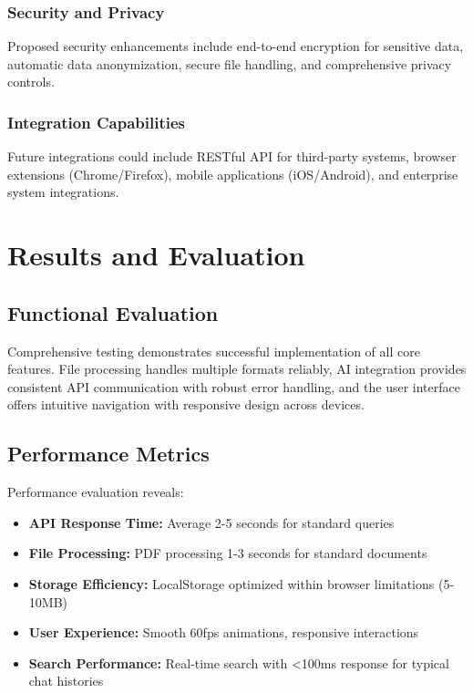 \documentclass[conference]{IEEEtran}
\begin{document}
\subsubsection{Security and Privacy}
Proposed security enhancements include end-to-end encryption for sensitive data, automatic data anonymization, secure file handling, and comprehensive privacy controls.

\subsubsection{Integration Capabilities}
Future integrations could include RESTful API for third-party systems, browser extensions (Chrome/Firefox), mobile applications (iOS/Android), and enterprise system integrations.

\section{Results and Evaluation}

\subsection{Functional Evaluation}
Comprehensive testing demonstrates successful implementation of all core features. File processing handles multiple formats reliably, AI integration provides consistent API communication with robust error handling, and the user interface offers intuitive navigation with responsive design across devices.

\subsection{Performance Metrics}
Performance evaluation reveals:
\begin{itemize}[itemsep=0pt, parsep=0pt, leftmargin=*]
    \item \textbf{API Response Time:} Average 2-5 seconds for standard queries
    \item \textbf{File Processing:} PDF processing 1-3 seconds for standard documents
    \item \textbf{Storage Efficiency:} LocalStorage optimized within browser limitations (5-10MB)
    \item \textbf{User Experience:} Smooth 60fps animations, responsive interactions
    \item \textbf{Search Performance:} Real-time search with <100ms response for typical chat histories
\end{itemize}
\end{document}
